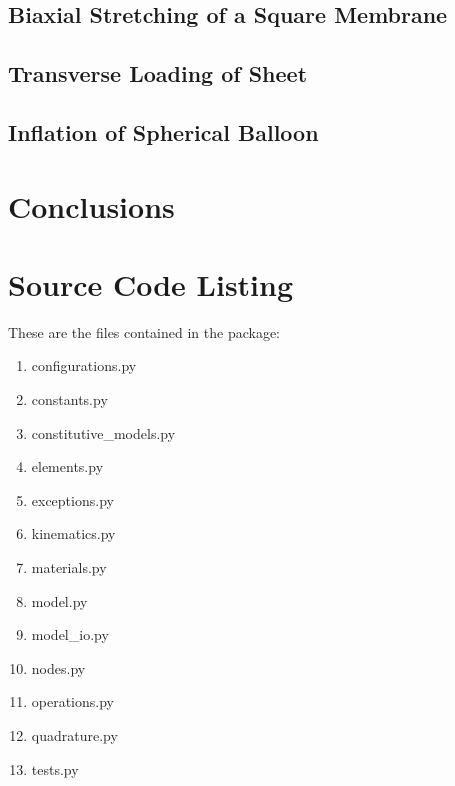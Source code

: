 \documentclass[]{spie}  %
\begin{document}
\subsection{Biaxial Stretching of a Square Membrane}

\subsection{Transverse Loading of Sheet}

\subsection{Inflation of Spherical Balloon}



\section{Conclusions}








	
\section{Source Code Listing}
These are the files contained in the package:
\begin{enumerate}
	\item configurations.py
	\item constants.py
	\item constitutive\_models.py
	\item elements.py
	\item exceptions.py
	\item kinematics.py
	\item materials.py 
	\item model.py
	\item model\_io.py
	\item nodes.py
	\item operations.py
	\item quadrature.py
	\item tests.py
\end{enumerate}
\end{document}
